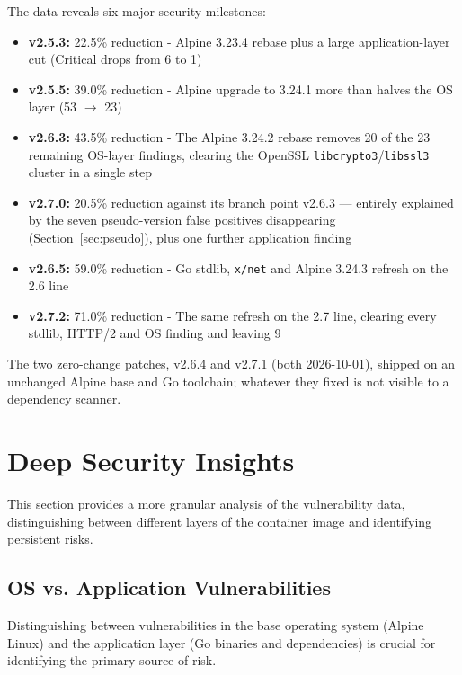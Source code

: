 \documentclass{article}
\begin{document}
The data reveals six major security milestones:
\begin{itemize}
    \item \textbf{v2.5.3:} 22.5\% reduction - Alpine 3.23.4 rebase plus a large application-layer cut (Critical drops from 6 to 1)
    \item \textbf{v2.5.5:} 39.0\% reduction - Alpine upgrade to 3.24.1 more than halves the OS layer (53 $\rightarrow$ 23)
    \item \textbf{v2.6.3:} 43.5\% reduction - The Alpine 3.24.2 rebase removes 20 of the 23 remaining OS-layer findings, clearing the OpenSSL \texttt{libcrypto3}/\texttt{libssl3} cluster in a single step
    \item \textbf{v2.7.0:} 20.5\% reduction against its branch point v2.6.3 --- entirely explained by the seven pseudo-version false positives disappearing (Section~\ref{sec:pseudo}), plus one further application finding
    \item \textbf{v2.6.5:} 59.0\% reduction - Go stdlib, \texttt{x/net} and Alpine 3.24.3 refresh on the 2.6 line
    \item \textbf{v2.7.2:} 71.0\% reduction - The same refresh on the 2.7 line, clearing every stdlib, HTTP/2 and OS finding and leaving 9
\end{itemize}

\noindent The two zero-change patches, v2.6.4 and v2.7.1 (both 2026-10-01), shipped on an unchanged Alpine base and Go toolchain; whatever they fixed is not visible to a dependency scanner.

\section{Deep Security Insights}
This section provides a more granular analysis of the vulnerability data, distinguishing between different layers of the container image and identifying persistent risks.

\subsection{OS vs. Application Vulnerabilities}
Distinguishing between vulnerabilities in the base operating system (Alpine Linux) and the application layer (Go binaries and dependencies) is crucial for identifying the primary source of risk.
\end{document}
